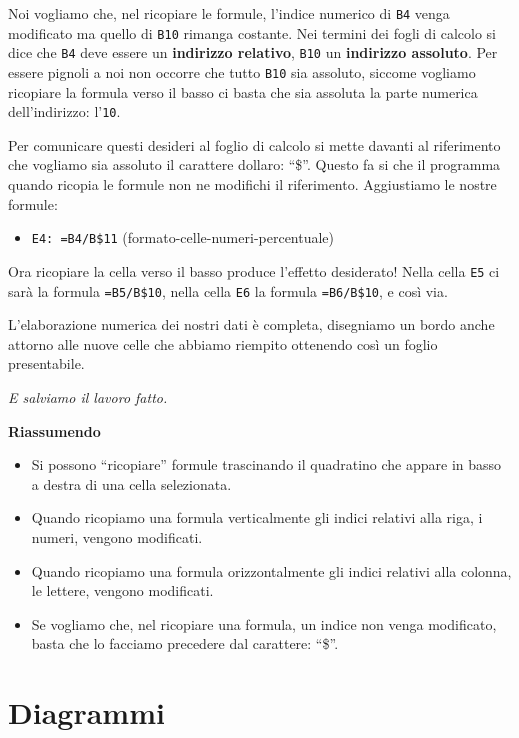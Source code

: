 Noi vogliamo che, nel ricopiare le formule, l'indice numerico di \texttt{B4} 
venga
modificato ma quello di \texttt{B10} rimanga costante.
Nei termini dei fogli di calcolo si dice che \texttt{B4} deve essere un
\textbf{indirizzo relativo}, \texttt{B10} un \textbf{indirizzo assoluto}.
Per essere pignoli a noi non occorre che tutto \texttt{B10} sia assoluto,
siccome vogliamo ricopiare la formula verso il basso ci basta che sia
assoluta la parte numerica dell'indirizzo: l'\texttt{10}.

Per comunicare questi desideri al foglio di calcolo si mette davanti
al riferimento che vogliamo sia assoluto il carattere dollaro: ``\$''.
Questo fa si che il programma quando ricopia le formule non ne modifichi
il riferimento.
Aggiustiamo le nostre formule:

\begin{itemize} [noitemsep]
\item \texttt{E4: =B4/B\$11}
(formato-celle-numeri-percentuale)
\end{itemize}

Ora ricopiare la cella verso il basso produce l'effetto desiderato!
Nella cella \texttt{E5} ci sarà la formula \texttt{=B5/B\$10},
nella cella \texttt{E6} la formula \texttt{=B6/B\$10}, e così via.

L'elaborazione numerica dei nostri dati è completa,
disegniamo un bordo anche attorno alle nuove celle che abbiamo
riempito ottenendo così un foglio presentabile.

\emph{E salviamo il lavoro fatto.}

\textbf{Riassumendo}
\begin{itemize} [nosep]
\item 
Si possono ``ricopiare'' formule trascinando il quadratino che appare in
basso a destra di una cella selezionata.
\item 
Quando ricopiamo una formula verticalmente gli indici relativi alla riga,
i numeri, vengono modificati.
\item 
Quando ricopiamo una formula orizzontalmente gli indici relativi alla
colonna, le lettere, vengono modificati.
\item 
Se vogliamo che, nel ricopiare una formula, un indice non venga modificato,
basta che lo facciamo precedere dal carattere: ``\$''.
\end{itemize}

\section{Diagrammi}
\label{05_01_f_di_calc:diagrammi}

